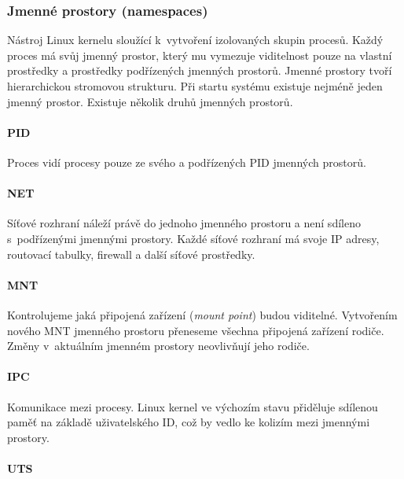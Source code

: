 \subsubsection{Jmenné prostory (namespaces)}

Nástroj Linux kernelu sloužící k~vytvoření izolovaných skupin procesů.
Každý proces má svůj jmenný prostor, který mu vymezuje viditelnost pouze na vlastní prostředky a prostředky podřízených jmenných prostorů.
Jmenné prostory tvoří hierarchickou stromovou strukturu.
Při startu systému existuje nejméně jeden jmenný prostor.
Existuje několik druhů jmenných prostorů.

\paragraph{PID}

Proces vidí procesy pouze ze svého a podřízených PID jmenných prostorů.
\cite{pid_namespaces}

\paragraph{NET}

Síťové rozhraní náleží právě do jednoho jmenného prostoru a není sdíleno s~podřízenými jmennými prostory.
Každé síťové rozhraní má svoje IP adresy, routovací tabulky, firewall a další síťové prostředky. 
\cite{namespaces}

\paragraph{MNT}

Kontrolujeme jaká připojená zařízení (\textit{mount point}) budou viditelné.
Vytvořením nového MNT jmenného prostoru přeneseme všechna připojená zařízení rodiče.
Změny v~aktuálním jmenném prostory neovlivňují jeho rodiče.
\cite{mnt_namespaces}

\paragraph{IPC}

Komunikace mezi procesy.
Linux kernel ve výchozím stavu přiděluje sdílenou paměť na základě uživatelského ID, což by vedlo ke kolizím mezi jmennými prostory.
\cite{namespaces}

\paragraph{UTS}

